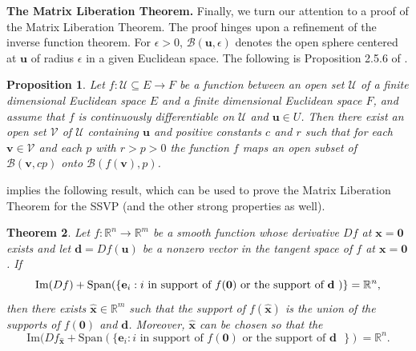 \documentclass[preprint,12pt]{elsarticle}
\newtheorem{theorem}{Theorem}[section]
\newtheorem{proposition}[theorem]{Proposition}
\begin{document}
\bigskip\noindent
{\bf The Matrix Liberation Theorem.}
Finally, we turn our attention to a proof of the Matrix Liberation Theorem. The proof hinges upon a refinement of the inverse function theorem. For $\epsilon>0$, 
$\mathcal{B}({\mathbf u}, \epsilon)$ denotes the open sphere centered at $\mathbf u$
of radius $\epsilon$ in a given Euclidean space.  The following is 
Proposition 2.5.6  of \cite{MRA}.






\begin{proposition}
\label{extendedIVT}
Let $f\colon \mathcal{U} \subseteq E \rightarrow F$ be a function 
between an open set $\mathcal{U}$ of a  finite dimensional Euclidean space $E$ and a finite dimensional Euclidean space $F$, and assume that $f$ is continuously differentiable on $\mathcal{ U}$ and 
 $\mathbf u \in U$.
Then there exist an open set $\mathcal{V}$ of $\mathcal{U}$ containing $\mathbf u$ and  positive constants $c$
and $r$ such that for 
 each ${\mathbf v} \in \mathcal{V}$ and each $p$ with  $r>p>0$ the function
$f$ maps an open subset of $\mathcal{B}( {\mathbf v},cp)$ onto $\mathcal{B}(f({{\mathbf v}}),p)$.
\end{proposition}

 implies
the following result, which can be used to prove the Matrix Liberation Theorem for the SSVP (and the other strong properties as well). 

\begin{theorem}
\label{IVTLiberate}
Let $f:\mathbb{R}^n \rightarrow  
\mathbb{R}^m$ be a smooth function
whose derivative  $Df$ at $\mathbf x= \mathbf 0$ exists and  let $\mathbf d= Df(\mathbf u)$ be a nonzero vector in the tangent space of $f$ at $\mathbf x= \mathbf 0$. 
If 
\begin{equation}
\label{cond} 
\mbox{\rm Im}(Df) + \mbox{\rm Span}(\{ \mathbf e_i: i \mbox{ in support of $f(\mathbf 0)$ or the support of $\mathbf d$ })\}  
= \mathbb{R}^n,
\end{equation}
then there exists $\widehat{\mathbf{x}} \in \mathbb{R}^m$
such that the support of $f(\widehat{\mathbf{x}})$ 
is the union of 
the supports of $f(\mathbf 0)$ and $\mathbf d$.  Moreover, $\widehat{\mathbf{x}}$ 
can be chosen so that the 
\begin{equation}
\label{cond'}
\mbox{Im}(Df_{\widehat{\mathbf{x}}} + \mbox{Span}(\{ \mathbf e_i: i \mbox{ in support of $f(\mathbf 0)$ or the support of $\mathbf d$  }\})  
= \mathbb{R}^n.
\end{equation}
\end{theorem} 
\end{document}
